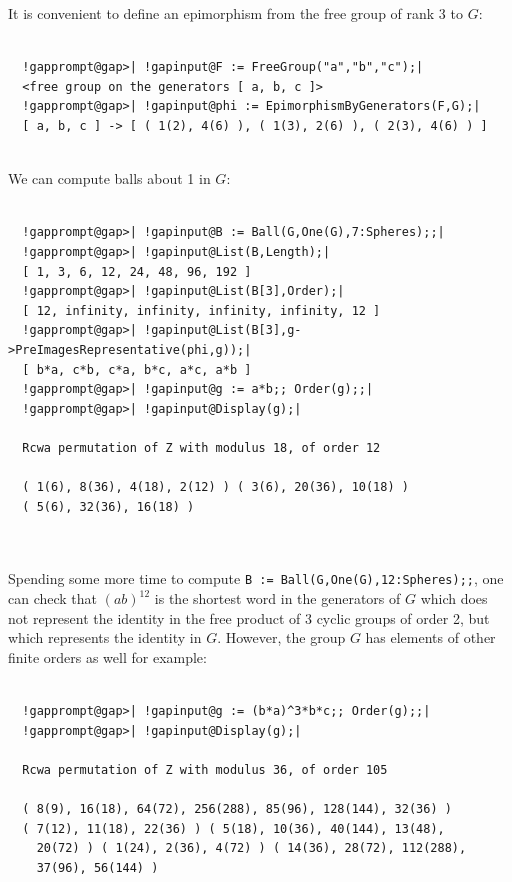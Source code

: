 \documentclass[a4paper,11pt]{report}
\begin{document}
{{\begin{Verbatim}[commandchars=!@|,fontsize=\small,frame=single,label=Example]
\end{Verbatim}
 It is convenient to define an epimorphism from the free group of rank 3 to $G$: 
\begin{Verbatim}[commandchars=!@|,fontsize=\small,frame=single,label=Example]
  
  !gapprompt@gap>| !gapinput@F := FreeGroup("a","b","c");|
  <free group on the generators [ a, b, c ]>
  !gapprompt@gap>| !gapinput@phi := EpimorphismByGenerators(F,G);|
  [ a, b, c ] -> [ ( 1(2), 4(6) ), ( 1(3), 2(6) ), ( 2(3), 4(6) ) ]
  
\end{Verbatim}
 We can compute balls about 1 in $G$: 
\begin{Verbatim}[commandchars=!@|,fontsize=\small,frame=single,label=Example]
  
  !gapprompt@gap>| !gapinput@B := Ball(G,One(G),7:Spheres);;|
  !gapprompt@gap>| !gapinput@List(B,Length);|
  [ 1, 3, 6, 12, 24, 48, 96, 192 ]
  !gapprompt@gap>| !gapinput@List(B[3],Order);|
  [ 12, infinity, infinity, infinity, infinity, 12 ]
  !gapprompt@gap>| !gapinput@List(B[3],g->PreImagesRepresentative(phi,g));|
  [ b*a, c*b, c*a, b*c, a*c, a*b ]
  !gapprompt@gap>| !gapinput@g := a*b;; Order(g);;|
  !gapprompt@gap>| !gapinput@Display(g);|
  
  Rcwa permutation of Z with modulus 18, of order 12
  
  ( 1(6), 8(36), 4(18), 2(12) ) ( 3(6), 20(36), 10(18) )
  ( 5(6), 32(36), 16(18) )
  
  
\end{Verbatim}
 Spending some more time to compute \texttt{B := Ball(G,One(G),12:Spheres);;}, one can check that $(ab)^{12}$ is the shortest word in the generators of $G$ which does not represent the identity in the free product of 3 cyclic groups
of order 2, but which represents the identity in $G$. However, the group $G$ has elements of other finite orders as well
\texttt{}\texttt{} for example: 
\begin{Verbatim}[commandchars=!@|,fontsize=\small,frame=single,label=Example]
  
  !gapprompt@gap>| !gapinput@g := (b*a)^3*b*c;; Order(g);;|
  !gapprompt@gap>| !gapinput@Display(g);|
  
  Rcwa permutation of Z with modulus 36, of order 105
  
  ( 8(9), 16(18), 64(72), 256(288), 85(96), 128(144), 32(36) )
  ( 7(12), 11(18), 22(36) ) ( 5(18), 10(36), 40(144), 13(48), 
    20(72) ) ( 1(24), 2(36), 4(72) ) ( 14(36), 28(72), 112(288), 
    37(96), 56(144) )
  

\end{Verbatim}}}
\end{document}

